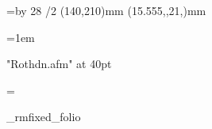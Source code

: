 \fontfam[arno]
\fontfam[unifrakturmaguntia]
\typosize[12/14.03]

\hsize=93.333mm
\vsize=\topskip \advance\vsize by 28\baselineskip
\margins/2 (140,210)mm (15.555,,21,)mm


\parskip0pt
\parindent=1em


\everymnote{\it}
\mnoteindent=4mm
\mnotesize=20mm

\font\roth "Rothdn.afm" at 40pt\relax

\def\alphabet{abcdefghijklmnopqrstuvwxyz}

\def\Vermillion{\setcmykcolor{0 71 77 11}}


\baselineskip\relax
\newif\iffootline \footlinetrue

\footline={%
    \iffootline
        \ifodd\pageno
            \hfill\_rmfixed\currvar \_folio%
        \else
            \_rmfixed\setff{+onum,+pnum}\currvar \_folio\hfill%
        \fi
    \else
        \global\footlinetrue
    \fi
}


\long{}
	
\def\endblockquote{%
	\par
	\egroup
	\vskip\baselineskip
	\_firstnoindent
}

\def\title#1{%
	\smash{%
		\vtop{%
			\parindent=0pt\relax
			\leftskip=30pt plus 1fill\relax
			\rightskip=\leftskip\relax
			\typosize[14/]%
			#1%
		}%
	}%
    \vskip5\baselineskip
    \_firstnoindent
}

\def\section#1{%
    \vskip0.5\baselineskip
    \centerline{%
		\Arno\it
    	\lower 1ex \hbox{#1}%
    }%
    \vskip0.5\baselineskip
    \_firstnoindent
}


\def\gridpic#1#2{%
	\vskip #1\baselineskip
	\picheight=#1\baselineskip\relax
	\advance \picheight by 1ex\relax
	\smash{%
		\vbox{%
			\centerline{\inspic{#2}}%
		}%
	}%
}%




\def\modulo#1#2{%
	{%
	\newcount\remainder
	\remainder=#1\relax
	\divide   \remainder by #2\relax
	\multiply \remainder by #2\relax
	\multiply \remainder by -1\relax
	\advance  \remainder by #1\relax
	\the\remainder
	}%
}





